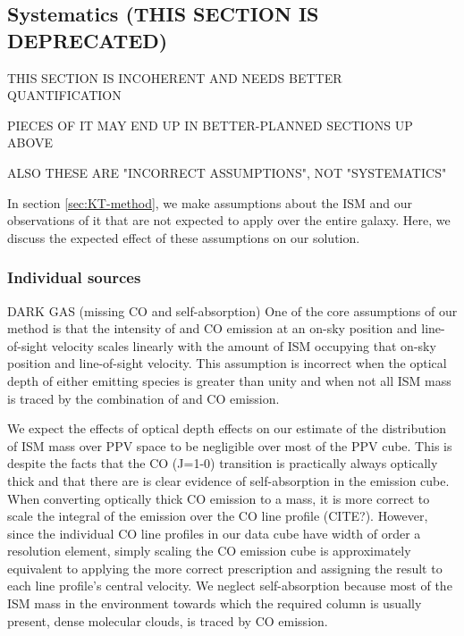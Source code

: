 \subsection{Systematics (THIS SECTION IS DEPRECATED)}
THIS SECTION IS INCOHERENT AND NEEDS BETTER QUANTIFICATION

PIECES OF IT MAY END UP IN BETTER-PLANNED SECTIONS UP ABOVE

ALSO THESE ARE "INCORRECT ASSUMPTIONS", NOT "SYSTEMATICS"

In section \ref{sec:KT-method}, we make assumptions about the ISM and our observations of it that are not expected to apply over the entire galaxy. Here, we discuss the expected effect of these assumptions on our solution.
\subsubsection{Individual sources}
DARK GAS (missing CO and \atomH self-absorption)
One of the core assumptions of our method is that the intensity of \atomH and CO emission at an on-sky position and line-of-sight velocity scales linearly with the amount of ISM occupying that on-sky position and line-of-sight velocity. This assumption is incorrect when the optical depth of either emitting species is greater than unity and when not all ISM mass is traced by the combination of \atomH and CO emission. 

We expect the effects of optical depth effects on our estimate of the distribution of ISM mass over PPV space to be negligible over most of the PPV cube. This is despite the facts that the CO (J=1-0) transition is practically always optically thick and that there are is clear evidence of \atomH self-absorption in the \atomH emission cube. When converting optically thick CO emission to a \molH mass, it is more correct to scale the integral of the emission over the CO line profile (CITE?). However, since the individual CO line profiles in our data cube have width of order a resolution element, simply scaling the CO emission cube is approximately equivalent to applying the more correct prescription and assigning the result to each line profile's central velocity. We neglect \atomH self-absorption because most of the ISM mass in the environment towards which the required \atomH column is usually present, dense molecular clouds, is traced by CO emission. 

